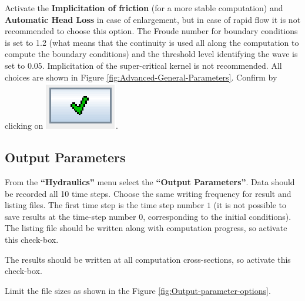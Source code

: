 \documentclass[a4paper,12pt]{article}
\begin{document}
Activate the \textbf{Implicitation of friction} (for a more stable
computation) and \textbf{Automatic Head Loss} in case of enlargement,
but in case of rapid flow it is not recommended to choose this option.
The Froude number for boundary conditions is set to 1.2 (what means
that the continuity is used all along the computation to compute the
boundary conditions) and the threshold level identifying the wave
is set to 0.05. Implicitation of the super-critical kernel is not
recommended. All choices are shown in Figure \ref{fig:Advanced-General-Parameters}.
Confirm by clicking on \includegraphics[scale=0.6]{valid}.


\subsection{Output Parameters}

\hspace{0.5cm} From the \textbf{{}``Hydraulics''} menu select the \textbf{{}``Output Parameters''}. Data should be recorded all
10 time steps. Choose the same writing frequency for result
and listing files. The first time step is the time step
number $1$ (it is not possible to save results at the time-step
number $0$, corresponding to the initial conditions). The listing file should be written
along with computation progress, so activate this check-box. 

\vspace{0.5cm}

The results should be written at all computation cross-sections, so
activate this check-box.

\vspace{0.5cm}

Limit the file sizes as shown in the Figure \ref{fig:Output-parameter-options}.
\end{document}
